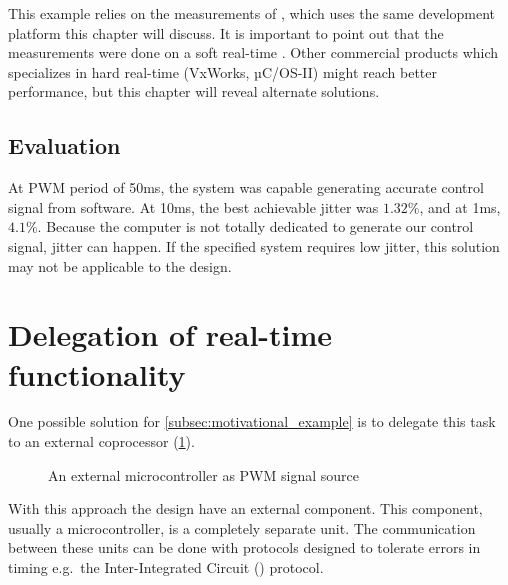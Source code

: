 This example relies on the measurements of \citep{rt-sched-thesis}, which uses the same development platform this chapter will discuss. It is important to point out that the measurements were done on a soft real-time \os. Other commercial products which specializes in hard real-time (VxWorks, µC/OS-II) might reach better performance, but this chapter will reveal alternate solutions.

\subsection{Evaluation}

At PWM period of 50ms, the system was capable generating accurate control signal from software. At 10ms, the best achievable jitter was $1.32\%$, and at 1ms, $4.1\%$.
Because the computer is not totally dedicated to generate our control signal, jitter can happen. If the specified system requires low jitter, this solution may not be applicable to the design.

\section{Delegation of real-time functionality}

One possible solution for \cref{subsec:motivational_example} is to delegate this task to an external coprocessor (\cref{fig:example_external_pwm}).

\begin{figure}[h]
	\centering
	\caption{An external microcontroller as PWM signal source}
\label{fig:example_external_pwm}
\end{figure}

With this approach the design have an external component. This component, usually a microcontroller, is a completely separate unit. The communication between these units can be done with protocols designed to tolerate errors in timing e.g.\ the Inter-Integrated Circuit (\isc) protocol.

